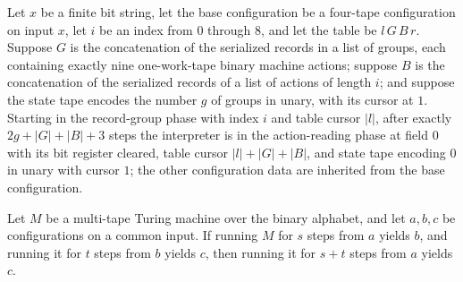 \begin{lemma}
\label{Turing.universal_select}
\leanok
{}
Let $x$ be a finite bit string, let the base configuration be a four-tape configuration
on input $x$, let $i$ be an index from $0$ through $8$, and let the table be
$l\,G\,B\,r$. Suppose $G$ is the concatenation of the serialized records in a list of
groups, each containing exactly nine one-work-tape binary machine actions; suppose $B$
is the concatenation of the serialized records of a list of actions of length $i$; and
suppose the state tape encodes the number $g$ of groups in unary, with its cursor at
$1$. Starting in the record-group phase with index $i$ and table cursor $|l|$, after
exactly $2g+|G|+|B|+3$ steps the interpreter is in the action-reading phase at field $0$
with its bit register cleared, table cursor $|l|+|G|+|B|$, and state tape encoding $0$
in unary with cursor $1$; the other configuration data are inherited from the base
configuration.
\end{lemma}

\begin{lemma}
\label{Turing.universal_run_join}
\leanok
{}
Let $M$ be a multi-tape Turing machine over the binary alphabet, and let $a,b,c$ be
configurations on a common input. If running $M$ for $s$ steps from $a$ yields $b$, and
running it for $t$ steps from $b$ yields $c$, then running it for $s+t$ steps from $a$
yields $c$.
\end{lemma}

